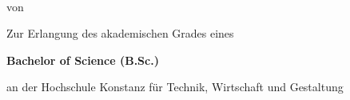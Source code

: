 \begin{titlepage}
    
    \AddToShipoutPicture*{\BackgroundImgTitelPage}
    
    \vspace*{12\bigskipamount}
    
    {
        \makeatletter
        \fboxsep=0pt
        \colorbox{htwg-white}{\begin{minipage}[t]{145mm}
            \begin{flushleft}
                \color{htwg-teal}\LARGE{\@report@typetext}
                \\
                \color{htwg-teal}\Large\textbf{\@title}
            \end{flushleft}
        \end{minipage}}
        \makeatother
    }
    
    \bigskip
    \bigskip

    von
    
    \bigskip
    
    {
        \makeatletter
        \large\bfseries\@author{} %
        \makeatother
    }
    
    \vfill
    
    Zur Erlangung des akademischen Grades eines

    {
        \makeatletter
        \fboxsep=0pt
        \colorbox{htwg-white}{\begin{minipage}[t]{50mm}
            \begin{flushleft}
                \vspace*{.6\bigskipamount}
                {\bfseries Bachelor of Science (B.Sc.)}
                \vspace*{.6\bigskipamount}
            \end{flushleft}
        \end{minipage}}
        \makeatother
    }
    
    
    
    an der Hochschule Konstanz für Technik, Wirtschaft und Gestaltung
    
    \vfill
    

\end{titlepage}
